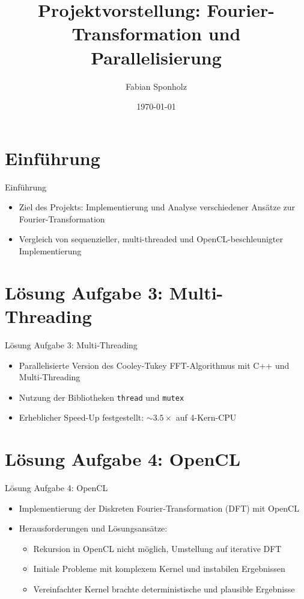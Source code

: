 \documentclass{beamer}
\title{Projektvorstellung: Fourier-Transformation und Parallelisierung}
\author{Fabian Sponholz}
\date{\today}
\begin{document}
\frame{\titlepage}

\section{Einführung}
\begin{frame}{Einführung}
    \begin{itemize}
        \item Ziel des Projekts: Implementierung und Analyse verschiedener Ansätze zur Fourier-Transformation
        \item Vergleich von sequenzieller, multi-threaded und OpenCL-beschleunigter Implementierung
    \end{itemize}
\end{frame}

\section{Lösung Aufgabe 3: Multi-Threading}
\begin{frame}{Lösung Aufgabe 3: Multi-Threading}
    \begin{itemize}
        \item Parallelisierte Version des Cooley-Tukey FFT-Algorithmus mit C++ und Multi-Threading
        \item Nutzung der Bibliotheken \texttt{thread} und \texttt{mutex}
        \item Erheblicher Speed-Up festgestellt: $\sim 3.5 \times$ auf 4-Kern-CPU
    \end{itemize}
\end{frame}

\section{Lösung Aufgabe 4: OpenCL}
\begin{frame}{Lösung Aufgabe 4: OpenCL}
    \begin{itemize}
        \item Implementierung der Diskreten Fourier-Transformation (DFT) mit OpenCL
        \item Herausforderungen und Lösungsansätze:
        \begin{itemize}
            \item Rekursion in OpenCL nicht möglich, Umstellung auf iterative DFT
            \item Initiale Probleme mit komplexem Kernel und instabilen Ergebnissen
            \item Vereinfachter Kernel brachte deterministische und plausible Ergebnisse
        \end{itemize}
    \end{itemize}
\end{frame}
\end{document}

